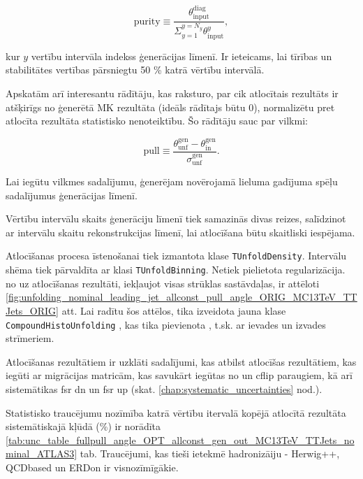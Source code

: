 \begin{equation}
  \text{purity}\equiv\frac{\theta^{\text{diag}}_{\text{input}}}{\Sigma_{y=1}^{y=N_{y}}\theta^{y}_{\text{input}}},
\end{equation}

kur $y$ vertību intervāla indekss ģenerācijas līmenī. Ir ieteicams, lai tīrības un stabilitātes vertības pārsniegtu 50 \% katrā vērtību intervālā.

Apskatām arī interesantu rādītāju, kas raksturo, par cik atlocītais rezultāts ir atšķirīgs no ģenerētā MK rezultāta (ideāls rādītajs būtu 0), normalizētu pret atlocīta rezultāta statistisko nenoteiktību. Šo rādītāju sauc par vilkmi:

\begin{equation}
  \text{pull}\equiv\frac{\theta^{\text{gen}}_{\text{unf}}-\theta^{\text{gen}}_{\text{in}}}{\sigma^{\text{gen}}_{\text{unf}}}.
\end{equation}

Lai iegūtu vilkmes sadalījumu, ģenerējam novērojamā lieluma gadījuma spēļu sadalījumus ģenerācijas līmenī.

Vērtību intervālu skaits ģenerāciju līmenī tiek samazinās divas reizes, salīdzinot ar intervālu skaitu rekonstrukcijas līmenī, lai atlocīšana būtu skaitliski iespējama.

Atlocīšanas procesa īstenošanai tiek izmantota \ROOT klase \lstinline[language=sh]|TUnfoldDensity|\cite{Schmitt:2012kp}. Intervālu shēma tiek pārvaldīta ar klasi \lstinline[language=sh]|TUnfoldBinning|. Netiek pielietota regularizācija. \pullangle no \leadingjet uz \scndleadingjet atlocīšanas rezultāti, iekļaujot visas strūklas sastāvdaļas, ir attēloti \ref{fig:unfolding_nominal_leading_jet_allconst_pull_angle_ORIG_MC13TeV_TTJets_ORIG} att. Lai radītu šos attēlos, tika izveidota jauna klase \lstinline[language=sh]|CompoundHistoUnfolding| \cite{url:compoundhistounfolding}, kas tika pievienota \ROOT, t.sk. ar ievades un izvades strīmeriem.

Atlocīšanas rezultātiem ir uzklāti sadalījumi, kas atbilst atlocīšas rezultātiem, kas iegūti ar migrācijas matricām, kas savukārt iegūtas no \ttbar \HERWIGpp un \ttbar cflip paraugiem, kā arī sistemātikas \ttbar fsr dn un \ttbar fsr up (skat. \ref{chap:systematic_uncertainties} nod.).

Statistisko \gls{traucējumu} nozīmība katrā vērtību itervalā kopējā atlocītā rezultāta sistemātiskajā kļūdā  (\%) ir norādīta \ref{tab:unc_table_fullpull_angle_OPT_allconst_gen_out_MC13TeV_TTJets_nominal_ATLAS3} tab. Traucējumi, kas tieši ietekmē hadronizāiju - \ttbar Herwig++, \ttbar QCDbased un \ttbar ERDon ir visnozīmīgākie.

